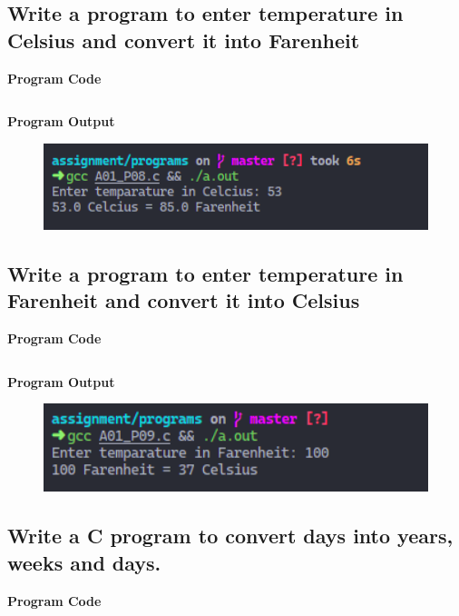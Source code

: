 \documentclass[a4paper, onecolumn]{article}
\begin{document}
\newpage



\subsection{Write a program to enter temperature in Celsius and convert it into Farenheit}
\textbf{Program Code}

\inputminted{C}{programs/A01_P08.c}

\textbf{Program Output}

\begin{figure}[h]
  \includegraphics[width=12cm]{A01_P08}
\end{figure}

\newpage



\subsection{Write a program to enter temperature in Farenheit and convert it into Celsius}
\textbf{Program Code}

\inputminted{C}{programs/A01_P09.c}

\textbf{Program Output}

\begin{figure}[h]
  \includegraphics[width=12cm]{A01_P09}
\end{figure}

\newpage



\subsection{Write a C program to convert days into years, weeks and days.}
\textbf{Program Code}
\end{document}
